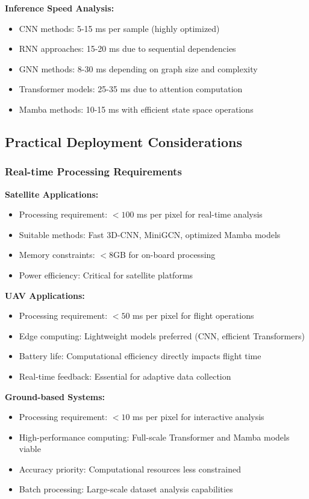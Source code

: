 \documentclass[journal]{IEEEtran}
\begin{document}
\textbf{Inference Speed Analysis:}
\begin{itemize}
\item CNN methods: 5-15 ms per sample (highly optimized)
\item RNN approaches: 15-20 ms due to sequential dependencies
\item GNN methods: 8-30 ms depending on graph size and complexity
\item Transformer models: 25-35 ms due to attention computation
\item Mamba methods: 10-15 ms with efficient state space operations
\end{itemize}

\subsection{Practical Deployment Considerations}

\subsubsection{Real-time Processing Requirements}

\textbf{Satellite Applications:}
\begin{itemize}
\item Processing requirement: $<100$ ms per pixel for real-time analysis
\item Suitable methods: Fast 3D-CNN, MiniGCN, optimized Mamba models
\item Memory constraints: $<8$GB for on-board processing
\item Power efficiency: Critical for satellite platforms
\end{itemize}

\textbf{UAV Applications:}
\begin{itemize}
\item Processing requirement: $<50$ ms per pixel for flight operations
\item Edge computing: Lightweight models preferred (CNN, efficient Transformers)
\item Battery life: Computational efficiency directly impacts flight time
\item Real-time feedback: Essential for adaptive data collection
\end{itemize}

\textbf{Ground-based Systems:}
\begin{itemize}
\item Processing requirement: $<10$ ms per pixel for interactive analysis
\item High-performance computing: Full-scale Transformer and Mamba models viable
\item Accuracy priority: Computational resources less constrained
\item Batch processing: Large-scale dataset analysis capabilities
\end{itemize}
\end{document}

